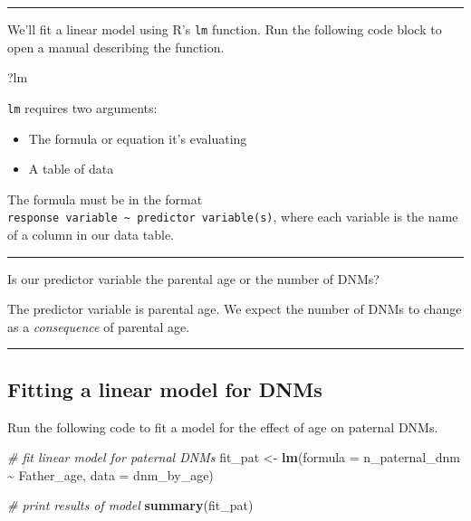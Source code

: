 \documentclass[
]{article}
\newenvironment{Shaded}{\begin{snugshade}}{\end{snugshade}}
\newcommand{\AttributeTok}[1]{\textcolor[rgb]{0.13,0.29,0.53}{#1}}
\newcommand{\CommentTok}[1]{\textcolor[rgb]{0.56,0.35,0.01}{\textit{#1}}}
\newcommand{\FunctionTok}[1]{\textcolor[rgb]{0.13,0.29,0.53}{\textbf{#1}}}
\newcommand{\NormalTok}[1]{#1}
\newcommand{\OtherTok}[1]{\textcolor[rgb]{0.56,0.35,0.01}{#1}}
\newcommand{\SpecialCharTok}[1]{\textcolor[rgb]{0.81,0.36,0.00}{\textbf{#1}}}
\providecommand{\tightlist}{%
  \setlength{\itemsep}{0pt}\setlength{\parskip}{0pt}}
\begin{document}
\begin{center}\rule{0.5\linewidth}{0.5pt}\end{center}

We'll fit a linear model using R's \texttt{lm} function. Run the
following code block to open a manual describing the function.

\begin{Shaded}
\begin{Highlighting}[]
\NormalTok{?lm}
\end{Highlighting}
\end{Shaded}

\texttt{lm} requires two arguments:

\begin{itemize}
\tightlist
\item
  The formula or equation it's evaluating
\item
  A table of data
\end{itemize}

The formula must be in the format
\texttt{response\ variable\ \textasciitilde{}\ predictor\ variable(s)},
where each variable is the name of a column in our data table.

\begin{center}\rule{0.5\linewidth}{0.5pt}\end{center}

Is our predictor variable the parental age or the number of DNMs?

The predictor variable is parental age. We expect the number of DNMs to
change as a \emph{consequence} of parental age.

\begin{center}\rule{0.5\linewidth}{0.5pt}\end{center}

\subsection{Fitting a linear model for
DNMs}\label{fitting-a-linear-model-for-dnms}

Run the following code to fit a model for the effect of age on paternal
DNMs.

\begin{Shaded}
\begin{Highlighting}[]
\CommentTok{\# fit linear model for paternal DNMs}
\NormalTok{fit\_pat }\OtherTok{\textless{}{-}} \FunctionTok{lm}\NormalTok{(}\AttributeTok{formula =}\NormalTok{ n\_paternal\_dnm }\SpecialCharTok{\textasciitilde{}}\NormalTok{ Father\_age,}
              \AttributeTok{data =}\NormalTok{ dnm\_by\_age)}

\CommentTok{\# print results of model}
\FunctionTok{summary}\NormalTok{(fit\_pat)}
\end{Highlighting}
\end{Shaded}
\end{document}
